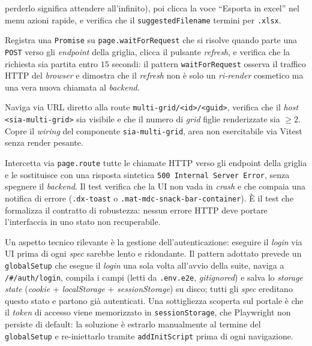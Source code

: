 \begin{description}
    perderlo significa attendere all'infinito), poi clicca la voce ``Esporta in
    excel'' nel menu azioni rapide, e verifica che il \texttt{suggestedFilename}
    termini per \texttt{.xlsx}.
  \item[\emph{Refresh}] Registra una \texttt{Promise} su \texttt{page.waitForRequest}
    che si risolve quando parte una \texttt{POST} verso gli \emph{endpoint} della
    griglia, clicca il pulsante \emph{refresh}, e verifica che la richiesta sia
    partita entro $15$ secondi: il pattern \texttt{waitForRequest} osserva il
    traffico HTTP del \emph{browser} e dimostra che il \emph{refresh} non è solo un
    \emph{ri-render} cosmetico ma una vera nuova chiamata al \emph{backend}.
  \item[\emph{Multi-grid}] Naviga via URL diretto alla route
    \texttt{multi-grid/<id>/<guid>}, verifica che il \emph{host}
    \texttt{<sia-multi-grid>} sia visibile e che il numero di \emph{grid} figlie
    renderizzate sia $\geq 2$. Copre il \emph{wiring} del componente
    \texttt{sia-multi-grid}, area non esercitabile via Vitest senza render pesante.
  \item[\emph{Error 500}] Intercetta via \texttt{page.route} tutte le chiamate HTTP
    verso gli endpoint della griglia e le sostituisce con una risposta sintetica
    \texttt{500 Internal Server Error}, senza spegnere il \emph{backend}. Il test
    verifica che la UI non vada in \emph{crash} e che compaia una notifica di errore
    (\texttt{.dx-toast} o \texttt{.mat-mdc-snack-bar-container}). È il test che
    formalizza il contratto di robustezza: nessun errore HTTP deve portare
    l'interfaccia in uno stato non recuperabile.
\end{description}

Un aspetto tecnico rilevante è la gestione dell'autenticazione: eseguire il
\emph{login} via UI prima di ogni \emph{spec} sarebbe lento e ridondante. Il pattern
adottato prevede un \texttt{globalSetup} che esegue il \emph{login} una sola volta
all'avvio della suite, naviga a \texttt{/\#/auth/login}, compila i campi (letti da
\texttt{.env.e2e}, \emph{gitignored}) e salva lo \emph{storage state} (\emph{cookie}
+ \emph{localStorage} + \emph{sessionStorage}) su disco; tutti gli \emph{spec}
ereditano questo stato e partono già autenticati. Una sottigliezza scoperta sul
portale è che il \emph{token} di accesso viene memorizzato in
\texttt{sessionStorage}, che Playwright non persiste di default: la soluzione è
estrarlo manualmente al termine del \texttt{globalSetup} e re-iniettarlo tramite
\texttt{addInitScript} prima di ogni navigazione.

